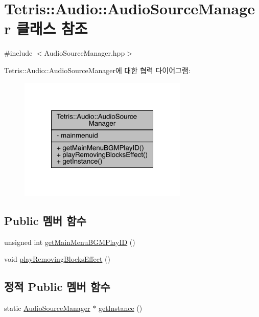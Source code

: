 \hypertarget{class_tetris_1_1_audio_1_1_audio_source_manager}{}\section{Tetris\+:\+:Audio\+:\+:Audio\+Source\+Manager 클래스 참조}
\label{class_tetris_1_1_audio_1_1_audio_source_manager}


{\ttfamily \#include $<$Audio\+Source\+Manager.\+hpp$>$}



Tetris\+:\+:Audio\+:\+:Audio\+Source\+Manager에 대한 협력 다이어그램\+:
\nopagebreak
\begin{figure}[H]
\begin{center}
\leavevmode
\includegraphics[width=228pt]{de/de7/class_tetris_1_1_audio_1_1_audio_source_manager__coll__graph}
\end{center}
\end{figure}
\subsection*{Public 멤버 함수}
\begin{DoxyCompactItemize}
\item 
unsigned int \hyperlink{class_tetris_1_1_audio_1_1_audio_source_manager_a64d6e7c7f0849d5de7cc26898079986c}{get\+Main\+Menu\+B\+G\+M\+Play\+ID} ()
\item 
void \hyperlink{class_tetris_1_1_audio_1_1_audio_source_manager_a44c761f0200291a2c8f282d8d52aa081}{play\+Removing\+Blocks\+Effect} ()
\end{DoxyCompactItemize}
\subsection*{정적 Public 멤버 함수}
\begin{DoxyCompactItemize}
\item 
static \hyperlink{class_tetris_1_1_audio_1_1_audio_source_manager}{Audio\+Source\+Manager} $\ast$ \hyperlink{class_tetris_1_1_audio_1_1_audio_source_manager_a561c580924ee6a13e6453b2d94764548}{get\+Instance} ()
\end{DoxyCompactItemize}
